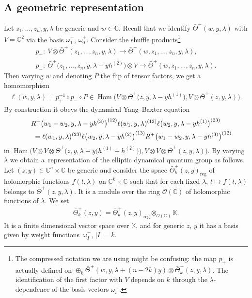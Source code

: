 \documentclass[pdftex]{sigma}
\numberwithin{equation}{section}
\begin{document}
\subsection{A geometric representation}\label{ss-3.7}
Let $z_1,\dots,z_n,y,\lambda$ be generic and $w\in\mathbb C$. Recall that we identify $\bar\Theta^+(w,y,\lambda)$ with $V=\mathbb C^2$ via the basis $\omega^+_1$, $\omega^+_0$. Consider the shuffle products\footnote{The compressed notation we are using might be confusing: the map $p_+$ is actually defined on $\oplus_k \bar\Theta^+(w,y,\lambda+(n-2k)y)\otimes\bar\Theta^+_k(z,y,\lambda)$. The identification of the first factor with $V$ depends on $k$ through the $\lambda$-dependence of the basis vectors $\omega^+_i$.}
\begin{gather*}
p_+\colon \ V \otimes \bar\Theta^+(z_1,\dots,z_n,y,\lambda)\to\bar\Theta^+(w,z_1,\dots,z_n,y,\lambda),\\
p_-\colon \ \bar\Theta^+\big(z_1,\dots,z_n,y,\lambda-yh^{(2)}\big)\otimes V \to \bar\Theta^+(w,z_1,\dots,z_n,y,\lambda).
\end{gather*}
Then varying $w$ and denoting $P$ the flip of tensor factors, we get a homomorphism
\begin{gather*}
 \ell(w,y,\lambda)=p_+^{-1}\circ p_-\circ P\in\operatorname{Hom}\big(V\otimes \bar\Theta^+\big(z,y,\lambda-y h^{(1)}\big),V\otimes \bar\Theta^+(z,y,\lambda)\big).
\end{gather*}
By construction it obeys the dynamical Yang--Baxter equation
\begin{gather}
 R^+\big(w_1-w_2,y,\lambda-y h^{(3)}\big)^{(12)}\ell(w_1,y,\lambda)^{(13)} \ell\big(w_2,y,\lambda-y h^{(1)}\big)^{(23)}\notag\\
\qquad{} = \ell(w_1,y,\lambda)^{(23)}\ell\big(w_2,y,\lambda-y h^{(2)}\big)^{(13)} R^+\big(w_1-w_2,y,\lambda-y h^{(3)}\big)^{(12)}\label{e-YBE1}
\end{gather}
in $\operatorname{Hom}\big(V\otimes V\otimes \bar\Theta^+\big(z,y,\lambda-y\big(h^{(1)}+h^{(2)}\big)\big), V\otimes V\otimes \bar\Theta^+(z,y,\lambda)\big)$. By varying $\lambda$ we obtain a~representation of the elliptic dynamical quantum group as follows. Let $(z,y)\in\mathbb C^n\times \mathbb C$ be generic and consider the space $\bar\Theta^+_k(z,y)_{\mathrm{reg}}$ of holomorphic functions $f(t,\lambda)$ on $\mathbb C^k\times \mathbb C$ such that for each fixed $\lambda$, $t\mapsto f(t,\lambda)$ belongs to $\bar\Theta^+(z,y,\lambda)$. It is a module over the ring $\mathcal O(\mathbb C)$ of holomorphic functions of $\lambda$. We set
\begin{gather*}
 \bar\Theta^+_k(z,y)=\bar\Theta^+_k(z,y)_{\mathrm{reg}}\otimes_{\mathcal O(\mathbb C)}\mathbb K.
\end{gather*}
It is a finite dimensional vector space over $\mathbb K$, and for generic $z$, $y$ it has a basis given by weight functions~$\omega^+_I$, $|I|=k$.
\end{document}

